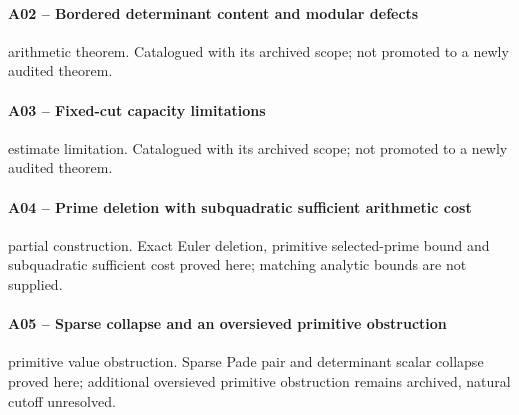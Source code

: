 \paragraph{A02 -- Bordered determinant content and modular defects}\label{record-A02}
arithmetic theorem. Catalogued with its archived scope; not promoted to a newly audited theorem.
\par\smallskip{}\par
\paragraph{A03 -- Fixed-cut capacity limitations}\label{record-A03}
estimate limitation. Catalogued with its archived scope; not promoted to a newly audited theorem.
\par\smallskip{}\par
\paragraph{A04 -- Prime deletion with subquadratic sufficient arithmetic cost}\label{record-A04}
partial construction. Exact Euler deletion, primitive selected-prime bound and subquadratic sufficient cost proved here; matching analytic bounds are not supplied.
\par\smallskip{}\par
\paragraph{A05 -- Sparse collapse and an oversieved primitive obstruction}\label{record-A05}
primitive value obstruction. Sparse Pade pair and determinant scalar collapse proved here; additional oversieved primitive obstruction remains archived, natural cutoff unresolved.
\par\smallskip{}\par
